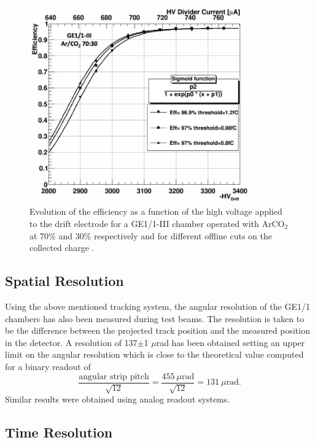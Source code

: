       \begin{figure}[t!]
        \centering
        \includegraphics[width=0.85\textwidth]{img/II-1-gem/efficiency.png}
        \caption{Evolution of the efficiency as a function of the high voltage applied to the drift electrode for a GE1/1-III chamber operated with ArCO$_2$ at 70\% and 30\% respectively and for different offline cuts on the collected charge \cite{Colaleo:2021453}.}
        \label{fig:II-1-efficiency-hv}
      \end{figure}

    \subsection{Spatial Resolution}

      Using the above mentioned tracking system, the angular resolution of the GE1/1 chambers has also been measured during test beams. The resolution is taken to be the difference between the projected track position and the measured position in the detector. A resolution of 137$\pm$1 $\mu$rad has been obtained setting an upper limit on the angular resolution which is close to the theoretical value computed for a binary readout of
      \begin{equation}
        \frac{\text{angular strip pitch}}{\sqrt{12}} = \frac{455\  \mu\text{rad}}{\sqrt{12}} = 131\ \mu\text{rad} .
      \end{equation}
      Similar results were obtained using analog readout systems. \\

    \subsection{Time Resolution}

